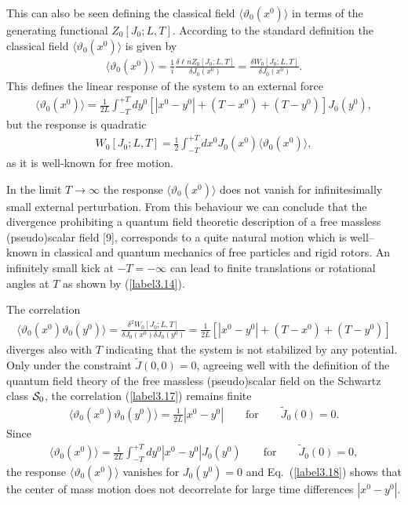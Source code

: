 \documentclass[a4paper,12pt] {article}
\begin{document}
This can also be seen defining the classical field
$\langle \vartheta_0(x^0) \rangle$ in terms of the generating
functional $Z_0[J_0;L,T]$.  According to the standard definition
the classical field $\langle \vartheta_0(x^0)\rangle$ is given by
%
\begin{eqnarray}\label{label3.14}
\langle \vartheta_0(x^0)\rangle
= \frac{1}{i}\frac{\delta {\ell n}Z_0[J_0;L,T]}{\delta J_0(x^0)}
= \frac{\delta W_0[J_0;L,T]}{\delta J_0(x^0)}.
\end{eqnarray}
%
This defines the linear response of the system to an external force
%
\begin{eqnarray}\label{label3.15}
\langle \vartheta_0(x^0)\rangle 
=\frac{1}{2L}\int_{-T}^{+T}dy^0
[|x^0 - y^0| + (T-x^0) +(T-y^0) ] J_0(y^0),
\end{eqnarray}
%
but the response is quadratic
%
\begin{eqnarray}\label{label3.16}
W_0[J_0;L,T]
= \frac{1}{2}\int_{-T}^{+T}dx^0
J_0(x^0) \langle \vartheta_0(x^0)\rangle,
\end{eqnarray}
%
as it is well-known for free motion.

In the limit $T\to \infty$ the response $\langle \vartheta_0(x^0)
\rangle$ does not vanish for infinitesimally small external
perturbation. From this behaviour we can conclude that the divergence
prohibiting a quantum field theoretic description of a free massless
(pseudo)scalar field [9], corresponds to a quite natural motion which
is well--known in classical and quantum mechanics of free particles
and rigid rotors. An infinitely small kick at $-T=-\infty$ can lead to
finite translations or rotational angles at $T$ as shown by
(\ref{label3.14}).

The correlation
%
\begin{eqnarray}\label{label3.17}
\langle \vartheta_0(x^0) \vartheta_0(y^0) \rangle
= \frac{\delta^2 W_0[J_0;L,T]}{\delta J_0(x^0)\delta J_0(y^0)}
=\frac{1}{2L}[|x^0 - y^0| + (T-x^0) +(T-y^0)]
\end{eqnarray}
%
diverges also with $T$ indicating that the system is not stabilized by
any potential. Only under the constraint $\tilde{J}(0,0) = 0$,
agreeing well with the definition of the quantum field theory of the
free massless (pseudo)scalar field on the Schwartz class ${\cal S}_0$,
the correlation (\ref{label3.17}) remains finite
%
\begin{eqnarray}\label{label3.18}
\langle \vartheta_0(x^0) \vartheta_0(y^0) \rangle
=\frac{1}{2L} |x^0 - y^0| \qquad \text{for} \qquad \tilde{J}_0(0) = 0.
\end{eqnarray}
%
Since
%
\begin{eqnarray}\label{label3.19}
\langle \vartheta_0(x^0)\rangle 
=\frac{1}{2L}\int_{-T}^{+T}dy^0 |x^0 - y^0| J_0(y^0) \qquad \text{for} \qquad \tilde{J}_0(0) = 0,
\end{eqnarray}
%
the response $\langle \vartheta_0(x^0)\rangle$ vanishes for $J_0(y^0)=0$ and Eq.~(\ref{label3.18}) shows that the center of mass
motion does not decorrelate for large time differences $|x^0 - y^0|$.
\end{document}

